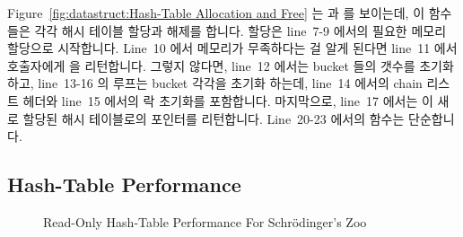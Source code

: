 Figure~\ref{fig:datastruct:Hash-Table Allocation and Free}
는  과  를 보이는데, 이 함수들은 각각
해시 테이블 할당과 해제를 합니다.
할당은 line~7-9 에서의 필요한 메모리 할당으로 시작합니다.
Line~10 에서 메모리가 무족하다는 걸 알게 된다면 line~11 에서 호출자에게
 을 리턴합니다.
그렇지 않다면, line~12 에서는 bucket 들의 갯수를 초기화하고, line~13-16 의
루프는 bucket 각각을 초기화 하는데, line~14 에서의 chain 리스트 헤더와 line~15
에서의 락 초기화를 포함합니다.
마지막으로, line~17 에서는 이 새로 할당된 해시 테이블로의 포인터를 리턴합니다.
Line~20-23 에서의  함수는 단순합니다.

\subsection{Hash-Table Performance}
\label{sec:datastruct:Hash-Table Performance}

\begin{figure}[tb]
\centering
{}
\caption{Read-Only Hash-Table Performance For Schr\"odinger's Zoo}
\label{fig:datastruct:Read-Only Hash-Table Performance For Schroedinger's Zoo}
\end{figure}

